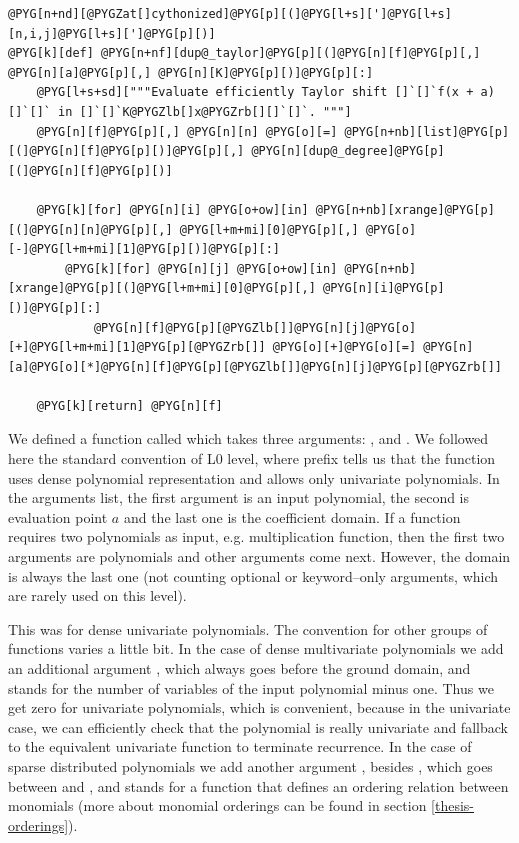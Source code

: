 \begin{Verbatim}[commandchars=@\[\]]
@PYG[n+nd][@PYGZat[]cythonized]@PYG[p][(]@PYG[l+s][']@PYG[l+s][n,i,j]@PYG[l+s][']@PYG[p][)]
@PYG[k][def] @PYG[n+nf][dup@_taylor]@PYG[p][(]@PYG[n][f]@PYG[p][,] @PYG[n][a]@PYG[p][,] @PYG[n][K]@PYG[p][)]@PYG[p][:]
    @PYG[l+s+sd]["""Evaluate efficiently Taylor shift []`[]`f(x + a)[]`[]` in []`[]`K@PYGZlb[]x@PYGZrb[][]`[]`. """]
    @PYG[n][f]@PYG[p][,] @PYG[n][n] @PYG[o][=] @PYG[n+nb][list]@PYG[p][(]@PYG[n][f]@PYG[p][)]@PYG[p][,] @PYG[n][dup@_degree]@PYG[p][(]@PYG[n][f]@PYG[p][)]

    @PYG[k][for] @PYG[n][i] @PYG[o+ow][in] @PYG[n+nb][xrange]@PYG[p][(]@PYG[n][n]@PYG[p][,] @PYG[l+m+mi][0]@PYG[p][,] @PYG[o][-]@PYG[l+m+mi][1]@PYG[p][)]@PYG[p][:]
        @PYG[k][for] @PYG[n][j] @PYG[o+ow][in] @PYG[n+nb][xrange]@PYG[p][(]@PYG[l+m+mi][0]@PYG[p][,] @PYG[n][i]@PYG[p][)]@PYG[p][:]
            @PYG[n][f]@PYG[p][@PYGZlb[]]@PYG[n][j]@PYG[o][+]@PYG[l+m+mi][1]@PYG[p][@PYGZrb[]] @PYG[o][+]@PYG[o][=] @PYG[n][a]@PYG[o][*]@PYG[n][f]@PYG[p][@PYGZlb[]]@PYG[n][j]@PYG[p][@PYGZrb[]]

    @PYG[k][return] @PYG[n][f]
\end{Verbatim}
\noindent
We defined a function called  which takes three arguments: ,  and . We
followed here the standard convention of L0 level, where  prefix tells us that the function
uses dense polynomial representation and allows only univariate polynomials. In the arguments list,
the first argument is an input polynomial, the second is evaluation point $a$ and the last one is
the coefficient domain. If a function requires two polynomials as input, e.g. multiplication function,
then the first two arguments are polynomials and other arguments come next. However, the domain is
always the last one (not counting optional or keyword--only arguments, which are rarely used on
this level).

This was for dense univariate polynomials. The convention for other groups of functions varies a
little bit. In the case of dense multivariate polynomials we add an additional argument , which
always goes before the ground domain, and stands for the number of variables of the input polynomial
minus one. Thus we get zero for univariate polynomials, which is convenient, because in the univariate
case, we can efficiently check that the polynomial is really univariate and fallback to the equivalent
univariate function to terminate recurrence. In the case of sparse distributed polynomials we add
another argument , besides , which goes between  and , and stands for a function
that defines an ordering relation between monomials (more about monomial orderings can be found in
section \ref{thesis-orderings}).


